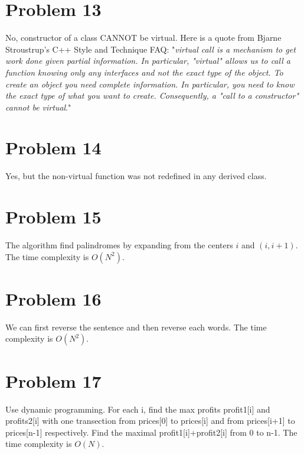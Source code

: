 \documentclass[12pt]{amsart}
\begin{document}
\section{Problem 13}

No,  constructor of a class CANNOT be virtual. Here is a quote from Bjarne Stroustrup's C++ Style and Technique FAQ: "{\em virtual call is a mechanism to get work done given partial information. In particular, "virtual" allows us to call a function knowing only any interfaces and not the exact type of the object. To create an object you need complete information. In particular, you need to know the exact type of what you want to create. Consequently, a "call to a constructor" cannot be virtual}."


\section{Problem 14}
Yes, but the non-virtual function was not redefined in any derived class.

\section{Problem 15}
The algorithm find palindromes by expanding from the centers $i$ and $(i,i+1)$. The time complexity is $O(N^2)$.

\begin{framed}

\end{framed}


\section{Problem 16}
We can first reverse the sentence and then reverse each words. The time complexity is $O(N^2)$.

\begin{framed}

\end{framed}



\section{Problem 17}
Use dynamic programming. For each i, find the max profits profit1[i] and profits2[i] with one transection from prices[0] to prices[i] and from prices[i+1] to prices[n-1] respectively. Find the  maximal profit1[i]+profit2[i] from 0 to n-1. The time complexity is $O(N)$.
\end{document}
